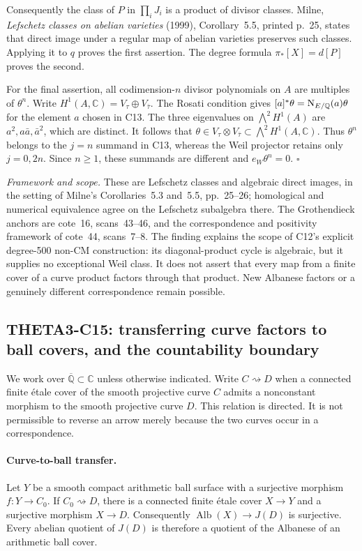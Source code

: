 \documentclass[11pt]{article}
\newcommand{\Q}{\mathbb Q}\newcommand{\C}{\mathbb C}\newcommand{\Z}{\mathbb Z}\newcommand{\R}{\mathbb R}\newcommand{\A}{\mathbb A}\newcommand{\OO}{\mathcal O}
\newcommand{\framework}[1]{\par\smallskip\noindent\textit{Framework and scope.} #1\par}
\theoremstyle{definition}\newtheorem{definition}[theorem]{Definition}\newtheorem{remark}[theorem]{Remark}
\begin{document}
Consequently the class of $P$ in $\prod_iJ_i$ is a product of divisor
classes. Milne, \emph{Lefschetz classes on abelian varieties} (1999),
Corollary~5.5, printed p.~25, states that direct image under a regular
map of abelian varieties preserves such classes. Applying it to $q$
proves the first assertion. The degree formula
$\pi_*[X]=d[P]$ proves the second.

For the final assertion, all codimension-$n$ divisor polynomials on
$A$ are multiples of $\theta^n$. Write
$H^1(A,\C)=V_\tau\oplus V_{\bar\tau}$. The Rosati condition gives
$[a]^*\theta=\Nm_{E/\Q}(a)\theta$ for the element $a$ chosen in C13.
The three eigenvalues on $\bigwedge^2H^1(A)$ are
$a^2,a\bar a,\bar a^2$, which are distinct. It follows that
$\theta\in V_\tau\otimes V_{\bar\tau}\subset\bigwedge^2H^1(A,\C)$.
Thus $\theta^n$ belongs to the $j=n$ summand in C13, whereas the
Weil projector retains only $j=0,2n$. Since $n\ge1$, these summands
are different and $e_W\theta^n=0$. $\square$

\framework{These are Lefschetz classes and algebraic direct images,
in the setting of Milne's Corollaries~5.3 and~5.5, pp.~25--26;
homological and numerical equivalence agree on the Lefschetz
subalgebra there. The Grothendieck anchors are cote~16,
scans~43--46, and the correspondence and positivity framework of
cote~44, scans~7--8. The finding explains the scope of C12's explicit
degree-500 non-CM construction: its diagonal-product cycle is
algebraic, but it supplies no exceptional Weil class. It does not
assert that every map from a finite cover of a curve product factors
through that product. New Albanese factors or a genuinely different
correspondence remain possible.}


\subsection{THETA3-C15: transferring curve factors to ball covers, and the countability boundary}
\label{C15}

We work over $\overline{\Q}\subset\C$ unless otherwise indicated.  Write
$C\rightsquigarrow D$ when a connected finite \'{e}tale cover of the smooth
projective curve $C$ admits a nonconstant morphism to the smooth projective
curve $D$.  This relation is directed.  It is not permissible to reverse an
arrow merely because the two curves occur in a correspondence.

\paragraph{Curve-to-ball transfer.}
Let $Y$ be a smooth compact arithmetic ball surface with a surjective morphism
$f:Y\to C_0$.  If $C_0\rightsquigarrow D$, there is a connected finite
\'{e}tale cover $X\to Y$ and a surjective morphism $X\to D$.  Consequently
$\operatorname{Alb}(X)\to J(D)$ is surjective.  Every abelian quotient of
$J(D)$ is therefore a quotient of the Albanese of an arithmetic ball cover.
\end{document}
